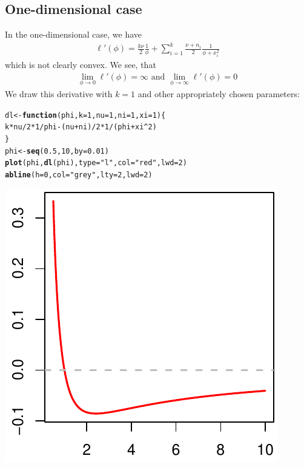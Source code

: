 \documentclass{article}\usepackage[]{graphicx}\usepackage[]{color}
\makeatletter
\def\maxwidth{ %
  \ifdim\Gin@nat@width>\linewidth
    \linewidth
  \else
    \Gin@nat@width
  \fi
}
\newcommand{\hlnum}[1]{\textcolor[rgb]{0.686,0.059,0.569}{#1}}%
\newcommand{\hlstr}[1]{\textcolor[rgb]{0.192,0.494,0.8}{#1}}%
\newcommand{\hlopt}[1]{\textcolor[rgb]{0,0,0}{#1}}%
\newcommand{\hlstd}[1]{\textcolor[rgb]{0.345,0.345,0.345}{#1}}%
\newcommand{\hlkwa}[1]{\textcolor[rgb]{0.161,0.373,0.58}{\textbf{#1}}}%
\newcommand{\hlkwb}[1]{\textcolor[rgb]{0.69,0.353,0.396}{#1}}%
\newcommand{\hlkwc}[1]{\textcolor[rgb]{0.333,0.667,0.333}{#1}}%
\newcommand{\hlkwd}[1]{\textcolor[rgb]{0.737,0.353,0.396}{\textbf{#1}}}%
\newenvironment{kframe}{%
 \def\at@end@of@kframe{}%
 \ifinner\ifhmode%
  \def\at@end@of@kframe{\end{minipage}}%
  \begin{minipage}{\columnwidth}%
 \fi\fi%
 \def\FrameCommand##1{\hskip\@totalleftmargin \hskip-\fboxsep
 \colorbox{shadecolor}{##1}\hskip-\fboxsep
     \hskip-\linewidth \hskip-\@totalleftmargin \hskip\columnwidth}%
 \MakeFramed {\advance\hsize-\width
   \@totalleftmargin\z@ \linewidth\hsize
   \@setminipage}}%
 {\par\unskip\endMakeFramed%
 \at@end@of@kframe}
\newenvironment{knitrout}{}{} %
\makeatother
\begin{document}
\subsection{One-dimensional case}
In the one-dimensional case, we have
\begin{align*}
  \ell'(\phi)
  = \frac{k\nu}{2}\frac{1}{\phi} +
      \sum_{i = 1}^k \frac{\nu + n_i}{2}\frac{1}{\phi + x_i^2}
\end{align*}
which is not clearly convex. We see, that
\begin{align*}
  \lim_{\phi \to 0} \ell'(\phi) = \infty
  \text{  and  }
  \lim_{\phi \to \infty} \ell'(\phi) = 0
\end{align*}
We draw this derivative with $k = 1$ and other appropriately chosen parameters:
\begin{knitrout}\footnotesize
{}\color{fgcolor}\begin{kframe}
\begin{alltt}
\hlstd{dl} \hlkwb{<-} \hlkwa{function}\hlstd{(}\hlkwc{phi}\hlstd{,} \hlkwc{k} \hlstd{=} \hlnum{1}\hlstd{,} \hlkwc{nu} \hlstd{=} \hlnum{1}\hlstd{,} \hlkwc{ni} \hlstd{=} \hlnum{1}\hlstd{,} \hlkwc{xi} \hlstd{=} \hlnum{1}\hlstd{)  \{}
  \hlstd{k}\hlopt{*}\hlstd{nu}\hlopt{/}\hlnum{2}\hlopt{*}\hlnum{1}\hlopt{/}\hlstd{phi} \hlopt{-} \hlstd{(nu} \hlopt{+} \hlstd{ni)}\hlopt{/}\hlnum{2} \hlopt{*} \hlnum{1}\hlopt{/}\hlstd{(phi} \hlopt{+} \hlstd{xi}\hlopt{^}\hlnum{2}\hlstd{)}
\hlstd{\}}
\hlstd{phi} \hlkwb{<-} \hlkwd{seq}\hlstd{(}\hlnum{0.5}\hlstd{,} \hlnum{10}\hlstd{,} \hlkwc{by} \hlstd{=} \hlnum{0.01}\hlstd{)}
\hlkwd{plot}\hlstd{(phi,} \hlkwd{dl}\hlstd{(phi),} \hlkwc{type} \hlstd{=} \hlstr{"l"}\hlstd{,} \hlkwc{col} \hlstd{=} \hlstr{"red"}\hlstd{,} \hlkwc{lwd} \hlstd{=} \hlnum{2}\hlstd{)}
\hlkwd{abline}\hlstd{(}\hlkwc{h} \hlstd{=} \hlnum{0}\hlstd{,} \hlkwc{col} \hlstd{=} \hlstr{"grey"}\hlstd{,} \hlkwc{lty} \hlstd{=} \hlnum{2}\hlstd{,} \hlkwc{lwd} \hlstd{=} \hlnum{2}\hlstd{)}
\end{alltt}
\end{kframe}
\includegraphics[width=\maxwidth]{figure/one_dimensional_loglik} 

\end{knitrout}
\end{document}
